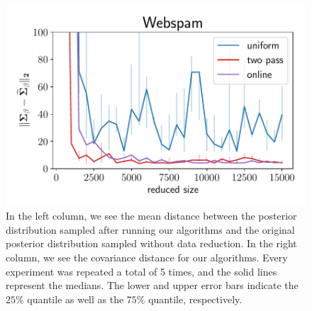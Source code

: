 \begin{figure}[ht!]
    \includegraphics[width=.49\linewidth]{figures/webspam_bayes_plot_matrix_norm.pdf}
    \caption{In the left column, we see the mean distance between the posterior
        distribution sampled after running our algorithms and
        the original posterior distribution sampled without data
        reduction. In the right column, we see the covariance distance for
        our algorithms. Every experiment was repeated a total
        of 5 times, and the solid lines represent the
        medians. The lower and upper error bars indicate the
        $25\%$ quantile as well as the $75\%$ quantile, respectively.}
    \label{fig:bayes-plots-norm-cov}
\end{figure}

